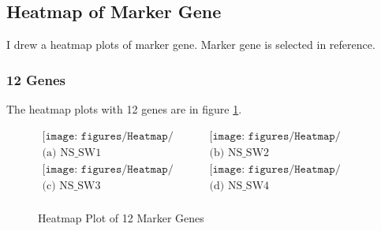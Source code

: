 \documentclass[aps, 10pt, a4paper]{article}
\begin{document}
        \subsection{Heatmap of Marker Gene}
            I drew a heatmap plots of marker gene. Marker gene is selected in reference. \cite{ref:sperm}
            \subsubsection{12 Genes}
                The heatmap plots with 12 genes are in figure \ref{fig:heat12genes}.
                \begin{figure}[hbp]
                    \begin{center}
                        $\begin{array}{cc}
                        \texttt{[image: figures/Heatmap/12Gene/1.png]}
                        &
                        \texttt{[image: figures/Heatmap/12Gene/2.png]}
                        \\
                        
                        \mbox{(a) NS\_SW1} & \mbox{(b) NS\_SW2} \\
                        
                        \texttt{[image: figures/Heatmap/12Gene/3.png]}
                        &
                        \texttt{[image: figures/Heatmap/12Gene/4.png]}
                        \\
                        
                        \mbox{(c) NS\_SW3} & \mbox{(d) NS\_SW4} \\
                    \end{array}$
                    \end{center}
                    \caption{Heatmap Plot of 12 Marker Genes}
                    \label{fig:heat12genes}
                \end{figure}
\end{document}
